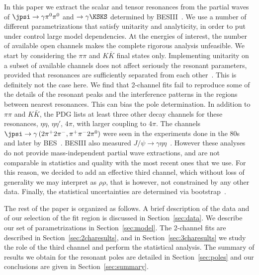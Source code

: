 In this paper we extract the scalar and tensor resonances from the partial waves of $\jpsi\to\gamma \pi^0\pi^0$ and $\to \gamma \KSKS$ 
determined by BESIII~\cite{Ablikim:2015umt,Ablikim:2018izx}.
We use a number of different parametrizations that satisfy unitarity and analyticity, in order to put under control large model dependencies. At the energies 
 of interest, the number of available open channels makes the complete rigorous analysis unfeasible. We start by considering the $\pi\pi$ and $K\bar K$ final states only. Implementing unitarity on a subset of available channels does not affect seriously the resonant parameters, provided that resonances are sufficiently separated from each other~\cite{JPAC:2017dbi,JPAC:2018zyd}. This is definitely not the case here. We find that 2-channel fits fail to reproduce some of the details of the resonant peaks and the interference patterns in the regions between nearest resonances. This can bias the pole determination. 
 In addition to $\pi\pi$ and $K\bar K$, the PDG lists at least three  other decay channels for these resonances, \ie $\eta \eta$, $\eta \eta'$, $4 \pi$, with larger coupling to $4\pi$. The channels $\jpsi \to \gamma \,(2\pi^+2\pi^-,\pi^+\pi^-2\pi^0)$ were seen in the experiments done  in the 80s~\cite{Baltrusaitis:1985nd,Bisello:1988as} and later by BES~\cite{Bai:1999mm}. BESIII also measured $J/\psi \to \gamma \eta \eta$~\cite{BESIII:2013qqz}. However these analyses do not provide mass-independent partial wave extractions, and are not comparable in statistics and quality with the most recent ones that we use. For this reason, we decided to add an effective  third channel, which without loss of generality we may interpret as  $\rho\rho$, that is  however, not  constrained by any other  data. 
 Finally, the statistical uncertainties are determined via bootstrap~\cite{recipes,EfroTibs93,Landay:2016cjw}.
 
 
The rest of the paper is organized as follows. A brief description of the data and 
of our selection of the fit region is discussed in Section~\ref{sec:data}. We describe our set of parametrizations in Section~\ref{sec:model}. The 2-channel fits are described in Section~\ref{sec:2charesults}, and in Section~\ref{sec:3charesults} we study the role of the third channel and perform the statistical analysis. 
The summary of results we obtain for the resonant poles are detailed in  Section~\ref{sec:poles} and our conclusions are given in Section~\ref{sec:summary}.

